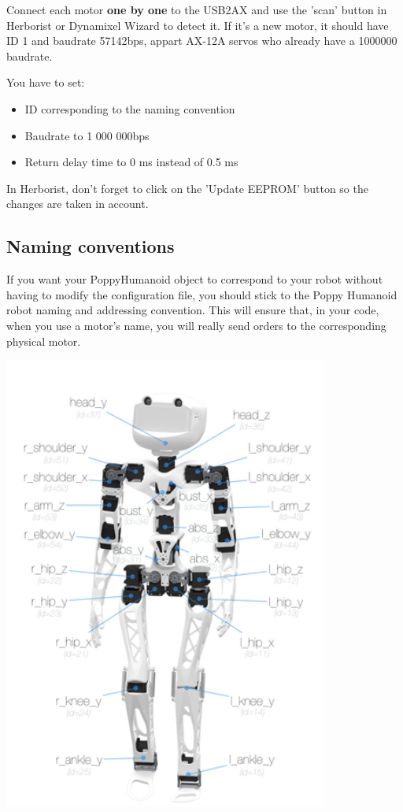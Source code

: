 \documentclass{article}
\begin{document}
 Connect each motor \textbf{one by one} to the USB2AX and use the 'scan' button in Herborist or Dynamixel Wizard to detect it. If it's a new motor, it should have ID 1 and baudrate 57142bps, appart AX-12A servos who already have a 1000000 baudrate.

You have to set:
\begin{itemize}
\item ID corresponding to the naming convention
\item Baudrate to 1 000 000bps
\item Return delay time to 0 ms instead of 0.5 ms
\end{itemize}

In Herborist, don't forget to click on the 'Update EEPROM' button so the changes are taken in account.


\subsection{Naming conventions}

If you want your PoppyHumanoid object to correspond to your robot without having to modify the configuration file, you should stick to the Poppy Humanoid robot naming and addressing convention. This will ensure that, in your code, when you use a motor's name, you will really send orders to the corresponding physical motor.
\begin{center}
  \includegraphics[width=0.8\textwidth]{motor_naming_convention}
 \end{center}
 
\end{document}
